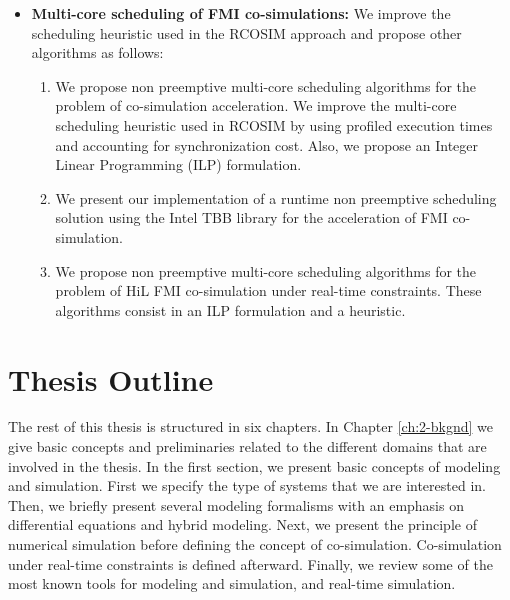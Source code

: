 \begin{itemize}
\begin{enumerate}
\setcounter{enumTemp}{\theenumi}

\end{enumerate}

\item \textbf{Multi-core scheduling of FMI co-simulations:} We improve the scheduling heuristic used in the RCOSIM approach and propose other algorithms as follows:

\begin{enumerate}

\setcounter{enumi}{\theenumTemp}

\item We propose non preemptive multi-core scheduling algorithms for the problem of co-simulation acceleration. We improve the multi-core scheduling heuristic used in RCOSIM by using profiled execution times and accounting for synchronization cost. Also, we propose an Integer Linear Programming (ILP) formulation.

\item We present our implementation of a runtime non preemptive scheduling solution using the Intel TBB library \cite{reinders:2007} for the acceleration of FMI co-simulation.

\item We propose non preemptive multi-core scheduling algorithms for the problem of HiL FMI co-simulation under real-time constraints. These algorithms consist in an ILP formulation and a heuristic.   

\end{enumerate}

\end{itemize}

\section{Thesis Outline}

The rest of this thesis is structured in six chapters. In Chapter \ref{ch:2-bkgnd} we give basic concepts and preliminaries related to the different domains that are involved in the thesis. In the first section, we present basic concepts of modeling and simulation. First we specify the type of systems that we are interested in. Then, we briefly present several modeling formalisms with an emphasis on differential equations and hybrid modeling. Next, we present the principle of numerical simulation before defining the concept of co-simulation. Co-simulation under real-time constraints is defined afterward. Finally, we review some of the most known tools for modeling and simulation, and real-time simulation.

